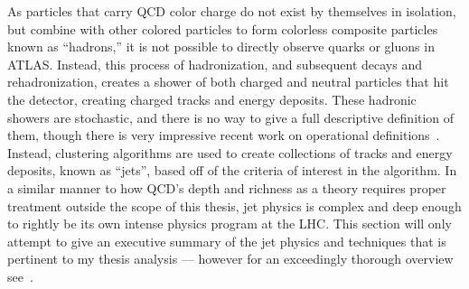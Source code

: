 As particles that carry \gls{QCD} color charge do not exist by themselves in isolation, but combine with other colored particles to form colorless composite particles known as ``hadrons,'' it is not possible to directly observe quarks or gluons in ATLAS.
Instead, this process of hadronization, and subsequent decays and rehadronization, creates a shower of both charged and neutral particles that hit the detector, creating charged tracks and energy deposits.
These hadronic showers are stochastic, and there is no way to give a full descriptive definition of them, though there is very impressive recent work on operational definitions~\cite{Metodiev:2018ftz,Komiske:2018vkc,Larkoski:2019nwj}.
Instead, clustering algorithms are used to create collections of tracks and energy deposits, known as ``jets'', based off of the criteria of interest in the algorithm.
In a similar manner to how QCD's depth and richness as a theory requires proper treatment outside the scope of this thesis, jet physics is complex and deep enough to rightly be its own intense physics program at the LHC.
This section will only attempt to give an executive summary of the jet physics and techniques that is pertinent to my thesis analysis --- however for an exceedingly thorough overview see~\cite{Nachman:2016qyc}.

